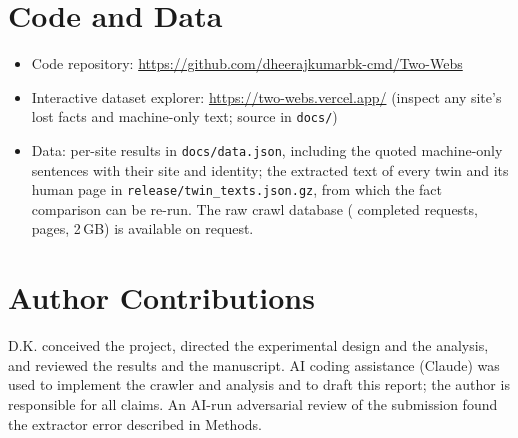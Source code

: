 \documentclass[10pt,a4paper]{article}
\begin{document}
\section*{Code and Data}
\begin{itemize}
\item Code repository: \url{https://github.com/dheerajkumarbk-cmd/Two-Webs}
\item Interactive dataset explorer: \url{https://two-webs.vercel.app/} (inspect any site's lost facts and machine-only text; source in \texttt{docs/})
\item Data: per-site results in \texttt{docs/data.json}, including the quoted machine-only sentences with their site and identity; the extracted text of every twin and its human page in \texttt{release/twin\_texts.json.gz}, from which the fact comparison can be re-run. The raw crawl database (\NRequests{} completed requests, \NPages{} pages, 2\,GB) is available on request.
\end{itemize}

\section*{Author Contributions}
D.K. conceived the project, directed the experimental design and the analysis, and reviewed the results and the manuscript. AI coding assistance (Claude) was used to implement the crawler and analysis and to draft this report; the author is responsible for all claims. An AI-run adversarial review of the submission found the extractor error described in Methods.
\end{document}
